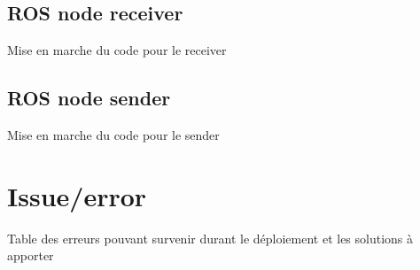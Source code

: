 \documentclass[10pt,letterpaper,oneside]{article}
\begin{document}
\subsection{ROS node receiver}

Mise en marche du code pour le receiver

\subsection{ROS node sender}

Mise en marche du code pour le sender

\section{Issue/error}

Table des erreurs pouvant survenir durant le déploiement et les solutions à apporter




\printbibliography
\end{document}
